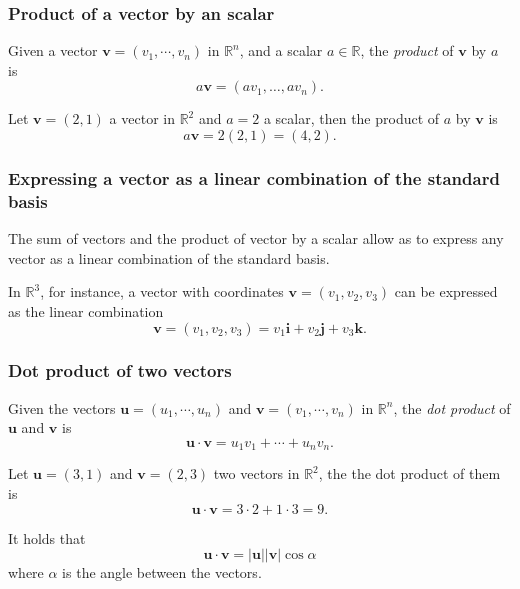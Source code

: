 \begin{frame}
\frametitle{Product of a vector by an scalar}
\begin{definition}
Given a vector $\mathbf{v}=(v_1,\cdots,v_n)$ in $\mathbb{R}^n$, and a scalar $a\in \mathbb{R}$, the \emph{product} of $\mathbf{v}$ by $a$ is 
\[
a\mathbf{v} = (av_1,\ldots, av_n).
\]
\end{definition}
Let $\mathbf{v}=(2,1)$ a vector in $\mathbb{R}^2$ and $a=2$ a scalar, then the product of $a$ by $\mathbf{v}$ is
\[
a\mathbf{v} = 2(2,1) = (4,2).
\]

\begin{center}

\end{center}
\end{frame}


\begin{frame}
\frametitle{Expressing a vector as a linear combination of the standard basis}
The sum of vectors and the product of vector by a scalar allow as to express any vector as a linear combination of the standard basis. 

In $\mathbb{R}^3$, for instance, a vector with coordinates $\mathbf{v}=(v_1,v_2,v_3)$ can be expressed as the linear combination
\[
\mathbf{v}=(v_1,v_2,v_3) = v_1\mathbf{i}+v_2\mathbf{j}+v_3\mathbf{k}.
\]

\begin{center}

\end{center}
\end{frame}


\begin{frame}
\frametitle{Dot product of two vectors}
\begin{definition}
Given the vectors $\mathbf{u}=(u_1,\cdots,u_n)$ and $\mathbf{v}=(v_1,\cdots,v_n)$ in $\mathbb{R}^n$, the 
\emph{dot product} of $\mathbf{u}$ and $\mathbf{v}$ is
\[
\mathbf{u}\cdot \mathbf{v} = u_1v_1 + \cdots + u_nv_n.
\]
\end{definition}

Let $\mathbf{u}=(3,1)$ and $\mathbf{v}=(2,3)$ two vectors in $\mathbb{R}^2$, the the dot product of them is
\[
\mathbf{u}\cdot\mathbf{v} = 3\cdot 2 +1\cdot 3 = 9.
\]

It holds that 
\[
\mathbf{u}\cdot\mathbf{v} =  |\mathbf{u}||\mathbf{v}|\cos\alpha
\]
where $\alpha$ is the angle between the vectors.
\end{frame}


